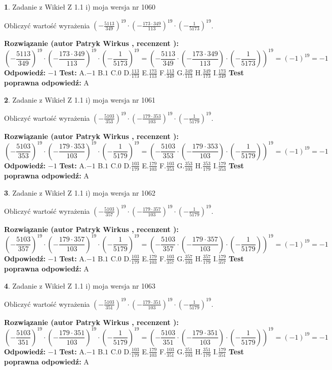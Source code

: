\documentclass[12pt, a4paper]{article}
\theoremstyle{definition} %
\newtheorem{zad}{}
\newcommand{\zadStart}[1]{\begin{zad}#1\newline}
\newcommand{\zadStop}{\end{zad}}
\newcommand{\rozwStart}[2]{\noindent \textbf{Rozwiązanie (autor #1 , recenzent #2): }\newline}
\newcommand{\rozwStop}{\newline}
\newcommand{\odpStart}{\noindent \textbf{Odpowiedź:}\newline}
\newcommand{\odpStop}{\newline}
\newcommand{\testStart}{\noindent \textbf{Test:}\newline}
\newcommand{\testStop}{\newline}
\newcommand{\kluczStart}{\noindent \textbf{Test poprawna odpowiedź:}\newline}
\newcommand{\kluczStop}{\newline}
\begin{document}
\zadStart{Zadanie z Wikieł Z 1.1 i) moja wersja nr 1060}

Obliczyć wartość wyrażenia $(-\frac{5113}{349})^{19} \cdot (-\frac{173 \cdot 349}{113})^{19} \cdot (-\frac{1}{5173})^{19}$.
\zadStop
\rozwStart{Patryk Wirkus}{}
$$(-\frac{5113}{349})^{19} \cdot (-\frac{173 \cdot 349}{113})^{19} \cdot (-\frac{1}{5173})^{19} = (-\frac{5113}{349} \cdot (-\frac{173 \cdot 349}{113}) \cdot (-\frac{1}{5173}))^{19} = (-1)^{19} = -1$$
\rozwStop
\odpStart
$-1$
\odpStop
\testStart
A.$-1$ B.$1$ C.$0$ D.$\frac{113}{173}$ E.$\frac{173}{113}$
F.$\frac{113}{349}$ G.$\frac{349}{113}$
H.$\frac{349}{173}$
I.$\frac{173}{349}$
\testStop
\kluczStart
A
\kluczStop



\zadStart{Zadanie z Wikieł Z 1.1 i) moja wersja nr 1061}

Obliczyć wartość wyrażenia $(-\frac{5103}{353})^{19} \cdot (-\frac{179 \cdot 353}{103})^{19} \cdot (-\frac{1}{5179})^{19}$.
\zadStop
\rozwStart{Patryk Wirkus}{}
$$(-\frac{5103}{353})^{19} \cdot (-\frac{179 \cdot 353}{103})^{19} \cdot (-\frac{1}{5179})^{19} = (-\frac{5103}{353} \cdot (-\frac{179 \cdot 353}{103}) \cdot (-\frac{1}{5179}))^{19} = (-1)^{19} = -1$$
\rozwStop
\odpStart
$-1$
\odpStop
\testStart
A.$-1$ B.$1$ C.$0$ D.$\frac{103}{179}$ E.$\frac{179}{103}$
F.$\frac{103}{353}$ G.$\frac{353}{103}$
H.$\frac{353}{179}$
I.$\frac{179}{353}$
\testStop
\kluczStart
A
\kluczStop



\zadStart{Zadanie z Wikieł Z 1.1 i) moja wersja nr 1062}

Obliczyć wartość wyrażenia $(-\frac{5103}{357})^{19} \cdot (-\frac{179 \cdot 357}{103})^{19} \cdot (-\frac{1}{5179})^{19}$.
\zadStop
\rozwStart{Patryk Wirkus}{}
$$(-\frac{5103}{357})^{19} \cdot (-\frac{179 \cdot 357}{103})^{19} \cdot (-\frac{1}{5179})^{19} = (-\frac{5103}{357} \cdot (-\frac{179 \cdot 357}{103}) \cdot (-\frac{1}{5179}))^{19} = (-1)^{19} = -1$$
\rozwStop
\odpStart
$-1$
\odpStop
\testStart
A.$-1$ B.$1$ C.$0$ D.$\frac{103}{179}$ E.$\frac{179}{103}$
F.$\frac{103}{357}$ G.$\frac{357}{103}$
H.$\frac{357}{179}$
I.$\frac{179}{357}$
\testStop
\kluczStart
A
\kluczStop



\zadStart{Zadanie z Wikieł Z 1.1 i) moja wersja nr 1063}

Obliczyć wartość wyrażenia $(-\frac{5103}{351})^{19} \cdot (-\frac{179 \cdot 351}{103})^{19} \cdot (-\frac{1}{5179})^{19}$.
\zadStop
\rozwStart{Patryk Wirkus}{}
$$(-\frac{5103}{351})^{19} \cdot (-\frac{179 \cdot 351}{103})^{19} \cdot (-\frac{1}{5179})^{19} = (-\frac{5103}{351} \cdot (-\frac{179 \cdot 351}{103}) \cdot (-\frac{1}{5179}))^{19} = (-1)^{19} = -1$$
\rozwStop
\odpStart
$-1$
\odpStop
\testStart
A.$-1$ B.$1$ C.$0$ D.$\frac{103}{179}$ E.$\frac{179}{103}$
F.$\frac{103}{351}$ G.$\frac{351}{103}$
H.$\frac{351}{179}$
I.$\frac{179}{351}$
\testStop
\kluczStart
A
\kluczStop
\end{document}
